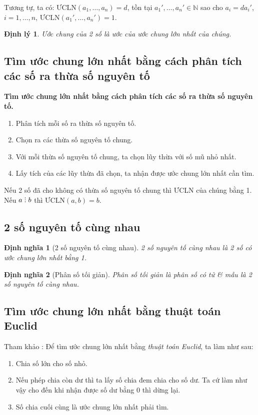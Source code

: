 \documentclass{article}
\numberwithin{equation}{section}
\newtheorem{dinhnghia}{Định nghĩa}[section]
\newtheorem{dinhly}{Định lý}[section]
\DeclareRobustCommand{\divby}{%
	\mathrel{\vbox{\baselineskip.65ex\lineskiplimit0pt\hbox{.}\hbox{.}\hbox{.}}}%
}
\begin{document}
Tương tự, ta có: $\mbox{ƯCLN}(a_1,\ldots,a_n)= d$, tồn tại $a_1',\ldots,a_n'\in\mathbb{N}$ sao cho $a_i = da_i'$, $i = 1,\ldots, n$, $\mbox{ƯCLN}(a_1',\ldots,a_n') = 1$.

\begin{dinhly}
	Ước chung của 2 số là ước của ước chung lớn nhất của chúng.
\end{dinhly}

\subsection{Tìm ước chung lớn nhất bằng cách phân tích các số ra thừa số nguyên tố}
\begin{tcolorbox}
	\textbf{Tìm ước chung lớn nhất bằng cách phân  tích các số ra thừa số nguyên tố.}
	\begin{enumerate}
		\item Phân tích mỗi số ra thừa số nguyên tố.
		\item Chọn ra các thừa số nguyên tố chung.
		\item Với mỗi thừa số nguyên tố chung, ta chọn lũy thừa với số mũ nhỏ nhất.
		\item Lấy tích của các lũy thừa đã chọn, ta nhận được ước chung lớn nhất cần tìm.
	\end{enumerate}
\end{tcolorbox}
Nếu 2 số đã cho không có thừa số nguyên tố chung thì ƯCLN của chúng bằng 1. Nếu $a\divby b$ thì $\mbox{ƯCLN}(a,b) = b$.

\subsection{2 số nguyên tố cùng nhau}

\begin{dinhnghia}[2 số nguyên tố cùng nhau]
	\emph{2 số nguyên tố cùng nhau} là 2 số có ước chung lớn nhất bằng 1.
\end{dinhnghia}

\begin{dinhnghia}[Phân số tối giản]
	\emph{Phân số tối giản} là phân số có tử \textit{\&} mẫu là 2 số nguyên tố cùng nhau.
\end{dinhnghia}

\subsection{Tìm ước chung lớn nhất bằng thuật toán Euclid}
Tham khảo \cite[p. 52]{SGK_Toan_6_Canh_Dieu_tap_1}: Để tìm ước chung lớn nhất bằng \textit{thuật toán Euclid}, ta làm như sau:
\begin{enumerate}
	\item Chia số lớn cho số nhỏ.
	\item Nếu phép chia còn dư thì ta lấy số chia đem chia cho số dư. Ta cứ làm như vậy cho đến khi nhận được số dư bằng 0 thì dừng lại.
	\item Số chia cuối cùng là ước chung lớn nhất phải tìm.
\end{enumerate}
\end{document}
